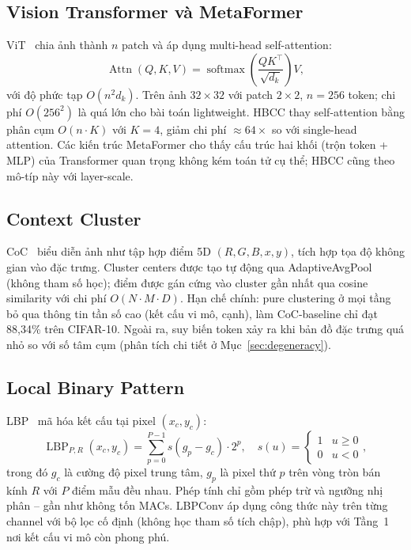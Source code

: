 \documentclass[journal]{IEEEtran}
\begin{document}
\subsection{Vision Transformer và MetaFormer}

ViT~\cite{Dosovitskiy2021ViT} chia ảnh thành $n$ patch và áp dụng
multi-head self-attention:
\begin{equation}
  \operatorname{Attn}(Q,K,V) =
  \operatorname{softmax}\!\!\left(\frac{QK^\top}{\sqrt{d_k}}\right)\!V,
  \label{eq:attn}
\end{equation}
với độ phức tạp $O(n^2 d_k)$. Trên ảnh $32\!\times\!32$ với patch
$2\!\times\!2$, $n{=}256$ token; chi phí $O(256^2)$ là quá lớn cho
bài toán lightweight. HBCC thay self-attention bằng phân cụm
$O(n\!\cdot\!K)$ với $K{=}4$, giảm chi phí $\approx\!64\!\times$
so với single-head attention. Các kiến trúc MetaFormer cho thấy cấu
trúc hai khối (trộn token + MLP) của Transformer quan trọng không
kém toán tử cụ thể; HBCC cũng theo mô-típ này với layer-scale.

\subsection{Context Cluster}

CoC~\cite{Ma2023ImageAsSetOfPoints} biểu diễn ảnh như tập hợp điểm
5D $(R,G,B,x,y)$, tích hợp tọa độ không gian vào đặc trưng. Cluster
centers được tạo tự động qua AdaptiveAvgPool (không tham số học);
điểm được gán cứng vào cluster gần nhất qua cosine similarity với
chi phí $O(N\!\cdot\!M\!\cdot\!D)$. Hạn chế chính: pure clustering ở
mọi tầng bỏ qua thông tin tần số cao (kết cấu vi mô, cạnh), làm
CoC-baseline chỉ đạt 88,34\% trên CIFAR-10. Ngoài ra, suy biến
token xảy ra khi bản đồ đặc trưng quá nhỏ so với số tâm cụm (phân
tích chi tiết ở Mục~\ref{sec:degeneracy}).

\subsection{Local Binary Pattern}

LBP~\cite{Ojala2002LBP} mã hóa kết cấu tại pixel $(x_c,y_c)$:
\begin{equation}
  \operatorname{LBP}_{P,R}(x_c,y_c) =
  \sum_{p=0}^{P-1} s(g_p - g_c)\cdot 2^p, \quad
  s(u) = \begin{cases}1 & u\geq0\\0 & u<0\end{cases},
  \label{eq:lbp}
\end{equation}
trong đó $g_c$ là cường độ pixel trung tâm, $g_p$ là pixel thứ $p$
trên vòng tròn bán kính $R$ với $P$ điểm mẫu đều nhau. Phép tính
chỉ gồm phép trừ và ngưỡng nhị phân -- gần như không tốn MACs.
LBPConv áp dụng công thức này trên từng channel với bộ lọc cố định
(không học tham số tích chập), phù hợp với Tầng~1 nơi kết cấu vi
mô còn phong phú.
\end{document}
